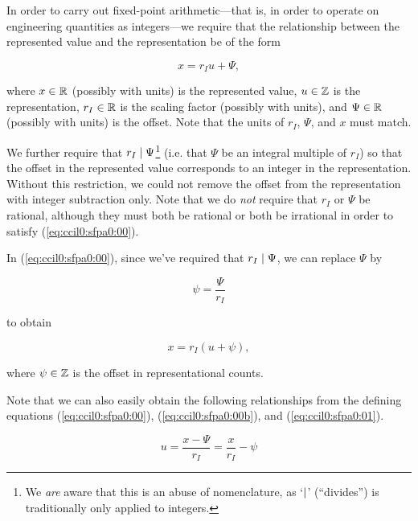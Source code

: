 In order to carry out fixed-point arithmetic---that is, in order to
operate on engineering quantities as integers---we 
require that the relationship between the 
represented value and the representation be of the form

\begin{equation}
\label{eq:ccil0:sfpa0:00}
x = r_I u + \Psi,
\end{equation}

\noindent{}where $x \in {\mathbb{R}}$ (possibly with units) is the represented
value, $u \in {\mathbb{Z}}$ is the representation, 
$r_I \in {\mathbb{R}}$ is the scaling factor (possibly with
units), and $\Psi \in {\mathbb{R}}$ (possibly with units) is the offset.
Note that the units of $r_I$, $\Psi$, and $x$  must match.

We further require that $r_I \mid{} \Psi$\footnote{We \emph{are}
aware that this is an abuse of nomenclature, as 
`$\mid$' (``divides'') is traditionally only applied to integers.} 
(i.e. that $\Psi$ be an
integral multiple of $r_I$)
so that the offset in the represented value corresponds to an integer
in the representation.  Without this restriction, we could not remove the
offset from the representation with integer subtraction only.  Note that
we do \emph{not} require that $r_I$ or $\Psi$ be rational, although
they must both be rational or both be irrational in order to satisfy
(\ref{eq:ccil0:sfpa0:00}).

In (\ref{eq:ccil0:sfpa0:00}), since we've required that $r_I \mid{} \Psi$, 
we can replace $\Psi$ by 

\begin{equation}
\label{eq:ccil0:sfpa0:00b}
\psi = \frac{\Psi}{r_I}
\end{equation}

\noindent{}to obtain

\begin{equation}
\label{eq:ccil0:sfpa0:01}
x = r_I (u + \psi),
\end{equation}

\noindent{}where $\psi \in {\mathbb{Z}}$ is the offset in representational
counts.

Note that we can also easily obtain the following relationships from the
defining equations (\ref{eq:ccil0:sfpa0:00}), 
(\ref{eq:ccil0:sfpa0:00b}), and (\ref{eq:ccil0:sfpa0:01}).

\begin{equation}
\label{eq:ccil0:sfpa0:02}
u = \frac{x - \Psi}{r_I} = \frac{x}{r_I} - \psi
\end{equation}

